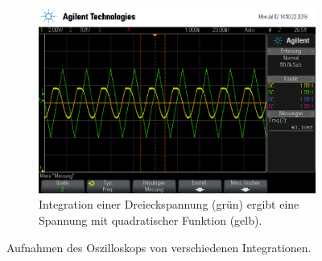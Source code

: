 \begin{figure}[ht]
\begin{subfigure}[]{\textwidth}
    \includegraphics[height=0.28\textheight]{data/scope_264.png}
    \caption{Integration einer Dreieckspannung (grün) ergibt eine Spannung mit quadratischer
    Funktion (gelb).}
    \label{subfig:int_dreieck}
  \end{subfigure}
  \caption{Aufnahmen des Oszilloskops von verschiedenen Integrationen.}
  \label{fig:integrationen}
\end{figure}


